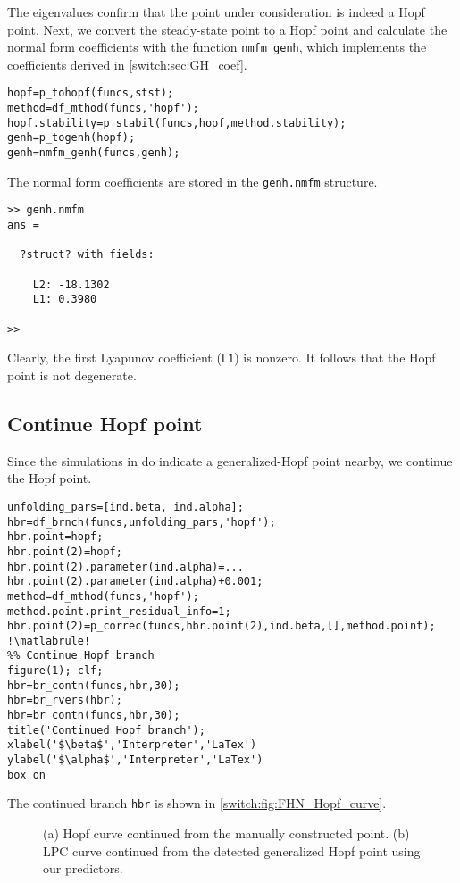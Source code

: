 The eigenvalues confirm that the point under consideration is indeed a Hopf point. Next, we convert the steady-state point to a Hopf point and calculate the normal form coefficients with the function \lstinline|nmfm_genh|, which implements the coefficients derived in \cref{switch:sec:GH_coef}.
\begin{lstlisting}[style=customMatlab]
%% Calculate critical normal form coefficients
hopf=p_tohopf(funcs,stst);
method=df_mthod(funcs,'hopf');
hopf.stability=p_stabil(funcs,hopf,method.stability);
genh=p_togenh(hopf);
genh=nmfm_genh(funcs,genh);
\end{lstlisting}
The normal form coefficients are stored in the \lstinline|genh.nmfm| structure.
\begin{lstlisting}[style=matlabConsole,keepspaces=true]
>> genh.nmfm
ans = 

  ?struct? with fields:

    L2: -18.1302
    L1: 0.3980

>> 
\end{lstlisting}
Clearly, the first Lyapunov coefficient (\lstinline|L1|) is nonzero. It follows that the Hopf point is not degenerate. 

\subsection{Continue Hopf point}
Since the simulations in \cite{Ma2011} do indicate a generalized-Hopf point nearby, we continue the Hopf point.
\begin{lstlisting}[style=customMatlab,escapechar=!]
%% Initialize Hopf branch
unfolding_pars=[ind.beta, ind.alpha];
hbr=df_brnch(funcs,unfolding_pars,'hopf');
hbr.point=hopf;
hbr.point(2)=hopf;
hbr.point(2).parameter(ind.alpha)=...
hbr.point(2).parameter(ind.alpha)+0.001;
method=df_mthod(funcs,'hopf');
method.point.print_residual_info=1;
hbr.point(2)=p_correc(funcs,hbr.point(2),ind.beta,[],method.point);
!\matlabrule!
%% Continue Hopf branch
figure(1); clf;
hbr=br_contn(funcs,hbr,30);
hbr=br_rvers(hbr);
hbr=br_contn(funcs,hbr,30);
title('Continued Hopf branch');
xlabel('$\beta$','Interpreter','LaTex')
ylabel('$\alpha$','Interpreter','LaTex')
box on
\end{lstlisting}
The continued branch \lstinline{hbr} is shown in \cref{switch:fig:FHN_Hopf_curve}.
\begin{figure}
\centering
{}
\hfill
{}
    \caption{\textup{(a)} Hopf curve continued from the manually constructed point. \textup{(b)} LPC curve continued from the detected generalized Hopf point using our predictors.}
\end{figure}

